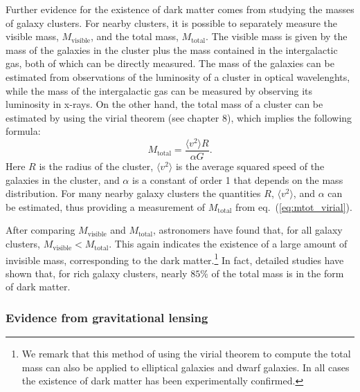 \documentclass[11pt, a4paper,oneside,openright]{book}
\numberwithin{equation}{section}
\begin{document}
Further evidence for the existence of dark matter comes from studying the masses of galaxy clusters. For nearby clusters, it is possible to separately measure the visible mass, $M_{\mathrm{visible}}$, and the total mass, $M_{\mathrm{total}}$. The visible mass is given by the mass of the galaxies in the cluster plus the mass contained in the intergalactic gas, both of which can be directly measured. The mass of the galaxies can be estimated from observations of the luminosity of a cluster in optical wavelenghts, while the mass of the intergalactic gas can be measured by observing its luminosity in x-rays. On the other hand, the total mass of a cluster can be estimated by using the virial theorem (see chapter 8), which implies the following formula:
\begin{equation} \label{eq:mtot_virial}
M_{\mathrm{total}}=\frac{\langle v^2\rangle R}{\alpha G}.
\end{equation}
Here $R$ is the radius of the cluster, $\langle v^2\rangle$ is the average squared speed of the galaxies in the cluster, and $\alpha$ is a constant of order 1 that depends on the mass distribution. For many nearby galaxy clusters the quantities $R$, $\langle v^2\rangle$, and $\alpha$ can be estimated, thus providing a measurement of $M_{\mathrm{total}}$ from eq.\ (\ref{eq:mtot_virial}).

After comparing $M_{\mathrm{visible}}$ and $M_{\mathrm{total}}$, astronomers have found that, for all galaxy clusters, $M_{\mathrm{visible}}<M_{\mathrm{total}}$. This again indicates the existence of a large amount of invisible mass, corresponding to the dark matter.\footnote{We remark that this method of using the virial theorem to compute the total mass can also be applied to elliptical galaxies and dwarf galaxies. In all cases the existence of dark matter has been experimentally confirmed.} In fact, detailed studies have shown that, for rich galaxy clusters, nearly $85\%$ of the total mass is in the form of dark matter.

\subsubsection{Evidence from gravitational lensing}
\end{document}
